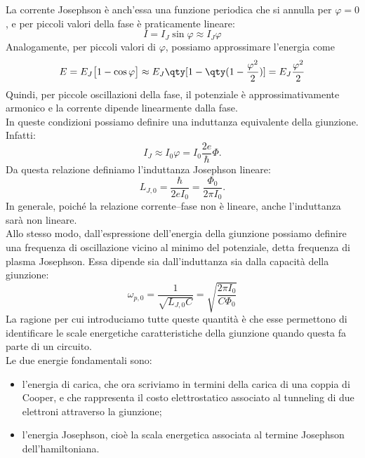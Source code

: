 La corrente Josephson è anch'essa una funzione periodica che si annulla per $\varphi=0$, e per piccoli valori della fase è praticamente lineare:
\begin{equation*}
    I=I_J \sin{\varphi} \approx I_J \varphi
\end{equation*}
Analogamente, per piccoli valori di $\varphi$, possiamo approssimare l'energia come
\begin{equation*}
    E
    =E_J \bigl[ 1 - \cos{\varphi} \bigr]
    \approx E_J \qty[ 1 - \qty(1 - \frac{\varphi^2}{2}) ]
    =E_J\frac{\varphi^2}{2}
\end{equation*}
Quindi, per piccole oscillazioni della fase, il potenziale è approssimativamente armonico e la corrente dipende linearmente dalla fase.\\
In queste condizioni possiamo definire una induttanza equivalente della giunzione. Infatti:
\begin{equation*}
    I_J
    \approx
    I_0\varphi
    =
    I_0
    \frac{2e}{\hbar}
    \Phi.
\end{equation*}
Da questa relazione definiamo l'induttanza Josephson lineare:
\begin{equation*}
    L_{J,0}
    =
    \frac{\hbar}{2eI_0}
    =
    \frac{\Phi_0}{2\pi I_0}.
\end{equation*}
In generale, poiché la relazione corrente--fase non è lineare, anche l'induttanza sarà non lineare.\\
Allo stesso modo, dall'espressione dell'energia della giunzione possiamo definire una frequenza di oscillazione vicino al minimo del potenziale, detta frequenza di plasma Josephson. Essa dipende sia dall'induttanza sia dalla capacità della giunzione:
\begin{equation*}
    \omega_{p,0}
    =
    \frac{1}{\sqrt{L_{J,0}C}}
    =
    \sqrt{
        \frac{2\pi I_0}{C\Phi_0}
    }
\end{equation*}
La ragione per cui introduciamo tutte queste quantità è che esse permettono di identificare le scale energetiche caratteristiche della giunzione quando questa fa parte di un circuito.\\
Le due energie fondamentali sono:
\begin{itemize}[leftmargin=0.5cm]
    \item l'energia di carica, che ora scriviamo in termini della carica di una coppia di Cooper, e che rappresenta il costo elettrostatico associato al tunneling di due elettroni attraverso la giunzione;
    \item l'energia Josephson, cioè la scala energetica associata al termine Josephson dell'hamiltoniana.
\end{itemize}
